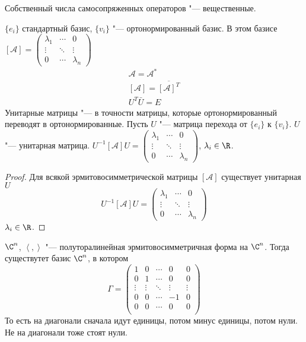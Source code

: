 \begin{conseq}
	Собственный числа самосопряженных операторов "--- вещественные.
\end{conseq}
\begin{theorem}
$\{e_i\}$ стандартный базис, $\{v_i\}$ "--- ортонормированный базис.
В этом базисе
$
	[\mathcal A] = \begin{pmatrix}
		\lambda_1 & \cdots & 0 \\
		\vdots & \ddots & \vdots \\
		0 & \cdots & \lambda_n
	\end{pmatrix}
$
\begin{gather*}
	\mathcal A = \mathcal{A}^* \\
	[\mathcal A] = \overline{[\mathcal A]^T} \\
	U^T\bar U = E
\end{gather*}
Унитарные матрицы "--- в точности матрицы, которые ортонормированный переводят в ортонормированные.
Пусть $U$ "--- матрица перехода от $\{e_i\}$ к $\{v_i\}$.
$U$  "--- унитарная матрица.
$
	U^{-1} [\mathcal A] U = \begin{pmatrix}
		\lambda_1 & \cdots & 0 \\
		\vdots & \ddots & \vdots \\
		0 & \cdots & \lambda_n
	\end{pmatrix}
$, $\lambda_i \in \R$.
\end{theorem}
\begin{proof}
	Для всякой эрмитовосимметрической матрицы  $[\mathcal A]$ существует унитарная $U$
	\[
		U^{-1}[\mathcal A]U = \begin{pmatrix}
			\lambda_1 & \cdots & 0 \\
			\vdots & \ddots & \vdots \\
			0 & \cdots & \lambda_n
		\end{pmatrix}
	\]
	$\lambda_i \in \R$.
\end{proof}

\begin{theorem}
	$\C^n$, $\left<,\right>$ "--- полуторалинейная эрмитовосимметричная форма на $\C^n$.
	Тогда существутет базис $\C^n$, в котором
	\[
		\Gamma = \begin{pmatrix}
			1 & 0 &\cdots & 0 & 0 \\
			0 & 1 &\cdots & 0 & 0 \\
			\vdots&\vdots &\ddots&\vdots&\vdots\\
			0 & 0 &\cdots & -1 & 0 \\
			0 & 0 &\cdots & 0 & 0\\
		\end{pmatrix}
	\]
	То есть на диагонали сначала идут единицы, потом минус единицы, потом нули.
	Не на диагонали тоже стоят нули.
\end{theorem}

